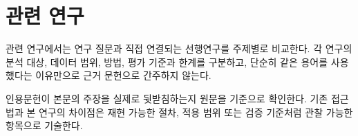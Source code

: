 \section{관련 연구}

관련 연구에서는 연구 질문과 직접 연결되는 선행연구를 주제별로 비교한다. 각 연구의 분석 대상, 데이터 범위, 방법, 평가 기준과 한계를 구분하고, 단순히 같은 용어를 사용했다는 이유만으로 근거 문헌으로 간주하지 않는다.

인용문헌이 본문의 주장을 실제로 뒷받침하는지 원문을 기준으로 확인한다. 기존 접근법과 본 연구의 차이점은 재현 가능한 절차, 적용 범위 또는 검증 기준처럼 관찰 가능한 항목으로 기술한다.
